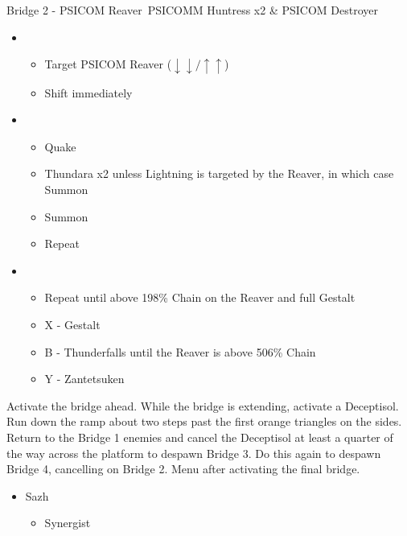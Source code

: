 \begin{multicols}{2}
	\begin{battle}[0:43]{Bridge 2 - PSICOM Reaver\, PSICOMM Huntress x2 \& PSICOM Destroyer}%
		\begin{itemize}
			\item \first
			      \begin{itemize}
				      \item Target PSICOM Reaver ($\downarrow\downarrow/\uparrow\uparrow$)
				      \item Shift immediately
			      \end{itemize}
			\item \second
			      \begin{itemize}
				      \item Quake
				      \item Thundara x2 unless Lightning is targeted by the Reaver, in which case Summon
				      \item Summon
				      \item Repeat
			      \end{itemize}
			\item \third
			      \begin{itemize}
				      \item Repeat until above 198\% Chain on the Reaver and full Gestalt
				      \item X - Gestalt
				      \item B - Thunderfalls until the Reaver is above 506\% Chain
				      \item Y - Zantetsuken
			      \end{itemize}
		\end{itemize}
		   
	\end{battle}
	Activate the bridge ahead. While the bridge is extending, activate a Deceptisol.  Run down the ramp about two steps past the first orange triangles on the sides. Return to the Bridge 1 enemies and cancel the Deceptisol at least a quarter of the way across the platform to despawn Bridge 3. Do this again to despawn Bridge 4, cancelling on Bridge 2. Menu after activating the final bridge.
	\begin{menu}
		\begin{itemize}
			\crystarium
			\begin{itemize}
				\item Sazh
				      \begin{itemize}
					      \item Synergist

\end{itemize}
\end{itemize}
\end{itemize}
\end{menu}
\end{multicols}
